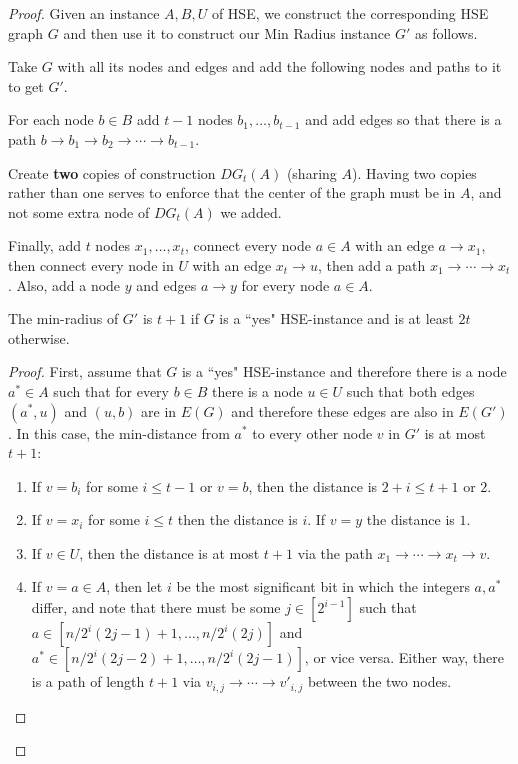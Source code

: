 \begin{proof}



Given an instance $A,B,U$ of HSE, we construct the corresponding HSE graph $G$ and then use it to construct our Min Radius instance $G'$ as follows.

Take $G$ with all its nodes and edges and add the following nodes and paths to it to get $G'$.

For each node $b \in B$ add $t-1$ nodes $b_1,\ldots,b_{t-1}$ and add edges so that there is a path $b \to b_1 \to b_2 \to \cdots \to b_{t-1}$.

Create {\bf two} copies of construction $DG_t(A)$ (sharing $A$). Having two copies rather than one serves to enforce that the center of the graph must be in $A$, and not some extra node of $DG_t(A)$ we added.






Finally, add $t$ nodes $x_1,\ldots,x_t$, connect every node $a \in A$ with an edge $a \to x_1$, then connect every node in $U$ with an edge $x_t \to u$, then add a path $x_1\to \cdots \to x_t$.
Also, add a node $y$ and edges $a \to y$ for every node $a \in A$.

\begin{claim}
The min-radius of $G'$ is $t+1$ if $G$ is a ``yes" HSE-instance and is at least $2t$ otherwise.
\end{claim}

\begin{proof}
First, assume that $G$ is a ``yes" HSE-instance and therefore there is a node $a^*\in A$ such that for every $b \in B$ there is a node $u \in U$ such that both edges $(a^*,u)$ and $(u,b)$ are in $E(G)$ and therefore these edges are also in $E(G')$.
In this case, the min-distance from $a^*$ to every other node $v$ in $G'$ is at most $t+1$:
\begin{enumerate} 
\item If $v = b_i$ for some $i \leq t-1$ or $v=b$, then the distance is $2+i \leq t+1$ or $2$.
\item If $v = x_i$ for some $i \leq t$ then the distance is $i$. If $v=y$ the distance is $1$.
\item If $v \in U$, then the distance is at most $t+1$ via the path $x_1 \to \cdots \to x_{t} \to v$.
\item If $v=a \in A$, then let $i$ be the most significant bit in which the integers $a,a^*$ differ, and note that there must be some $j \in [2^{i-1}]$ such that $a \in [n/2^i (2j-1)+1,\ldots,n/2^i (2j)]$ and $a^* \in [n/2^i (2j-2)+1,\ldots,n/2^i (2j-1)]$, or vice versa. Either way, there is a path of length $t+1$ via $v_{i,j}\to \cdots \to v'_{i,j}$ between the two nodes.


\end{enumerate}
\end{proof}
\end{proof}
